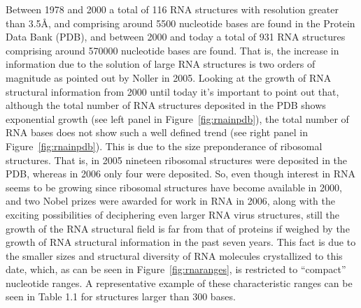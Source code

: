 \noindent Between  1978 and  2000 a total  of 116 RNA  structures with
resolution greater than 3.5\AA,  and comprising around 5500 nucleotide
bases are found  in the Protein Data Bank (PDB),  and between 2000 and
today  a  total of  931  RNA  structures comprising  around
570000  nucleotide  bases  are   found.   That  is,  the  increase  in
information due to the solution  of large RNA structures is two orders
of   magnitude  as   pointed  out   by  Noller   \cite{noller2005}  in
2005. Looking  at the growth  of RNA structural information  from 2000
until  today it's  important to  point  out that,  although the  total
number of RNA structures deposited in the PDB shows exponential growth
(see left panel in Figure~\ref{fig:rnainpdb}), the total number of RNA
bases does  not show  such a  well defined trend  (see right  panel in
Figure~\ref{fig:rnainpdb}).  This is due  to the size preponderance of
ribosomal structures.  That is,  in 2005 nineteen ribosomal structures
were deposited in  the PDB, whereas in 2006  only four were deposited.
So, even  though interest in RNA  seems to be  growing since ribosomal
structures have  become available in  2000, and two Nobel  prizes were
awarded for work in RNA in 2006, along with the exciting possibilities
of  deciphering even larger  RNA virus  structures, still
the growth of the RNA structural field is far from that of proteins if
weighed by the growth of  RNA structural information in the past seven
years. This fact is due to the smaller sizes and structural
diversity   of   RNA   molecules crystallized to this date,   which,   as
can   be   seen   in
Figure~\ref{fig:rnaranges},  is restricted  to  ``compact'' nucleotide
ranges.
A representative example of these  characteristic ranges can be seen in
Table 1.1 for structures larger than 300 bases.

